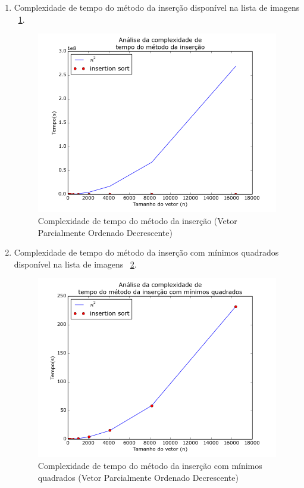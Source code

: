 \documentclass[12pt,a4paper,twoside]{report}
\begin{document}
\begin{enumerate}
\begin{enumerate}
											\item Complexidade de tempo do método da inserção disponível na lista de imagens ~\ref{fig:InsertionPlot2POD}.
											\begin{figure}[!h]
												\centering
												\includegraphics[scale=0.6]{../imagens/Insertion/insertion_plot_2_parcialmente_ordenado_decrescente.png}
												\caption{Complexidade de tempo do método da inserção (Vetor Parcialmente Ordenado Decrescente) \label{fig:InsertionPlot2POD}}
											\end{figure}


											\item Complexidade de tempo do método da inserção com mínimos quadrados disponível na lista de imagens  ~\ref{fig:InsertionPlot3POD}.
											\begin{figure}[!h]
												\centering
												\includegraphics[scale=0.6]{../imagens/Insertion/insertion_plot_3_parcialmente_ordenado_decrescente.png}
												\caption{Complexidade de tempo do método da inserção com mínimos quadrados (Vetor Parcialmente Ordenado Decrescente) \label{fig:InsertionPlot3POD}}
											\end{figure}

										\end{enumerate}


\end{enumerate}
\end{document}
